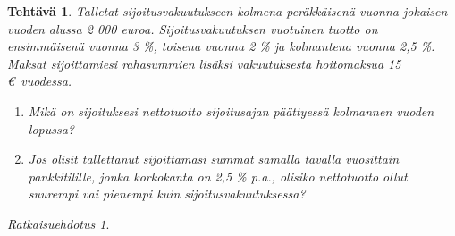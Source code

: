 \documentclass{article}\usepackage[]{graphicx}\usepackage[]{color}
\newtheorem{teht}{Tehtävä}
\theoremstyle{remark}
\newtheorem*{ratk}{Ratkaisuehdotus}
\begin{document}
\begin{teht} Talletat sijoitusvakuutukseen kolmena peräkkäisenä vuonna jokaisen vuoden alussa 2 000 euroa. Sijoitusvakuutuksen vuotuinen tuotto on ensimmäisenä vuonna 3 \%, toisena vuonna 2 \% ja kolmantena vuonna 2{,}5 \%. Maksat sijoittamiesi rahasummien lisäksi vakuutuksesta hoitomaksua 15 \euro \ vuodessa. 
\begin{enumerate}
  \item Mikä on sijoituksesi nettotuotto sijoitusajan päättyessä kolmannen vuoden lopussa? 
  \item Jos olisit tallettanut sijoittamasi summat samalla tavalla vuosittain pankkitilille, jonka korkokanta on 2{,}5 \% p.a., olisiko nettotuotto ollut suurempi vai pienempi kuin sijoitusvakuutuksessa?
\end{enumerate}
\end{teht}

\begin{ratk}\end{ratk}
\end{document}
